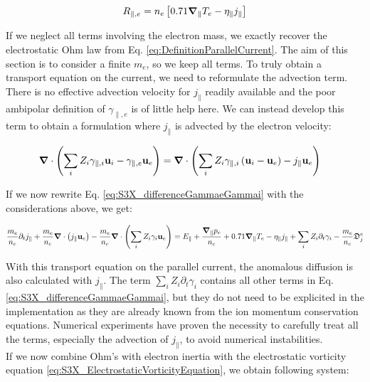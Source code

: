 \begin{align}
	R_{\parallel,e} = n_e\left[0.71\grad_\parallel T_e - \eta_\parallel j_\parallel\right]
\end{align}

If we neglect all terms involving the electron mass, we exactly recover the electrostatic Ohm law from Eq. \ref{eq:DefinitionParallelCurrent}. The aim of this section is to consider a finite $m_e$, so we keep all terms. To truly obtain a transport equation on the current, we need to reformulate the advection term. There is no effective advection velocity for $j_\parallel$ readily available and the poor ambipolar definition of $\gamma_{\parallel,e}$ is of little help here. We can instead develop this term to obtain a formulation where $j_\parallel$ is advected by the electron velocity:

\begin{align}
	\grad\cdot\left(\sum_i Z_i\gamma_{\parallel,i}\mathbf{u}_i - \gamma_{\parallel,e}\mathbf{u}_e\right) &= \grad\cdot\left(\sum_i Z_i\gamma_{\parallel,i}\left(\mathbf{u}_i-\mathbf{u}_e\right) - j_\parallel\mathbf{u}_e\right)
\end{align}

If we now rewrite Eq. \ref{eq:S3X_differenceGammaeGammai} with the considerations above, we get: 

\begin{equation}
	\label{eq:S3X_OhmLawElectronInertia}
	\frac{m_e}{n_e}\partial_t j_\parallel + \frac{m_e}{n_e}\grad\cdot\left(j_\parallel\mathbf{u}_e\right)  - \frac{m_e}{n_e}\grad\cdot\left(\sum_i Z_i\gamma_i\mathbf{u}_e\right) = E_\parallel + \frac{\grad_\parallel p_e}{n_e} + 0.71\grad_\parallel T_e - \eta_\parallel j_\parallel + \sum_i Z_i \partial_t \gamma_i - \frac{m_e}{n_e}\mathfrak{D}_j^e
\end{equation}

With this transport equation on the parallel current, the anomalous diffusion is also calculated with $j_\parallel$. The term $\sum_i Z_i \partial_t \gamma_i$ contains all other terms in Eq. \ref{eq:S3X_differenceGammaeGammai}, but they do not need to be explicited in the implementation as they are already known from the ion momentum conservation equations. Numerical experiments have proven the necessity to carefully treat all the terms, especially the advection of $j_\parallel$, to avoid numerical instabilities. \\

If we now combine Ohm's with electron inertia with the electrostatic vorticity equation \ref{eq:S3X_ElectrostaticVorticityEquation}, we obtain following system:

